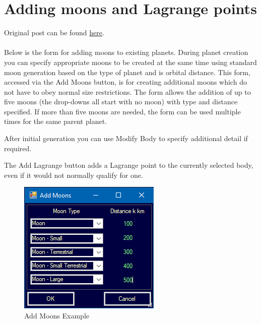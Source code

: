 \documentclass[../../Aurora C# unofficial manual.tex]{subfiles}
\begin{document}
	\section{Adding moons and Lagrange points}\label{6_adding_moons_and_lagrange}
	Original post can be found
	\href{http://aurora2.pentarch.org/index.php?topic=8495.msg118787#msg118787}{here}.
	\\\\
	
	Below is the form for adding moons to existing planets. During planet creation you can specify appropriate moons to be created at the same time using standard moon generation based on the type of planet and is orbital distance. This form, accessed via the Add Moons button, is for creating additional moons which do not have to obey normal size restrictions. The form allows the addition of up to five moons (the drop-downs all start with no moon) with type and distance specified. If more than five moons are needed, the form can be used multiple times for the same parent planet.
	
	After initial generation you can use Modify Body to specify additional detail if required.
	
	The Add Lagrange button adds a Lagrange point to the currently selected body, even if it would not normally qualify for one.
	\begin{figure}[H]
		\centering
		\includegraphics[width=0.5\linewidth]{images/AddMoons}
		\caption[Add Moons Example]{Add Moons Example}
		\label{fig:addmoons}
	\end{figure}
\end{document}

